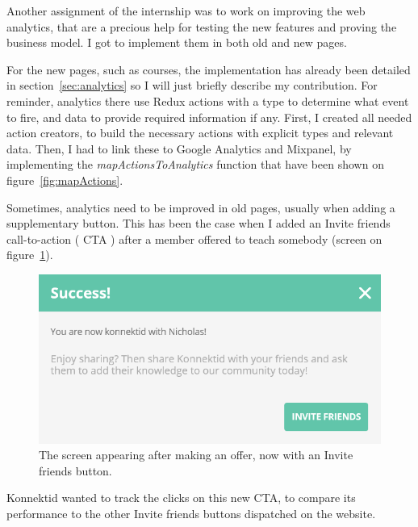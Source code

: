 Another assignment of the internship was to work on improving the web analytics, that are a precious help for testing the new features and proving the business model. I got to implement them in both old and new pages.

For the new pages, such as courses, the implementation has already been detailed in {\sc section}~\ref{sec:analytics} so I will just briefly describe my contribution. For reminder, analytics there use Redux actions with a type to determine what event to fire, and data to provide required information if any. First, I created all needed action creators, to build the necessary actions with explicit types and relevant data. Then, I had to link these to Google Analytics and Mixpanel, by implementing the \textit{mapActionsToAnalytics} function that have been shown on {\sc figure}~\ref{fig:mapActions}. 

Sometimes, analytics need to be improved in old pages, usually when adding a supplementary button. This has been the case when I added an \guillemotleft{} Invite friends \guillemotright{} call-to-action (\guillemotleft{} CTA \guillemotright{}) 
after a member offered to teach somebody (screen on {\sc figure}~\ref{fig:afterOffer}).

\begin{figure}[H]
    \centering
    \includegraphics[scale=0.8]{figure/afterOffer.png}
    \caption{The screen appearing after making an offer, now with an Invite friends button.}
    \label{fig:afterOffer}
\end{figure}

Konnektid wanted to track the clicks on this new CTA, to compare its performance to the other Invite friends buttons dispatched on the website. 

